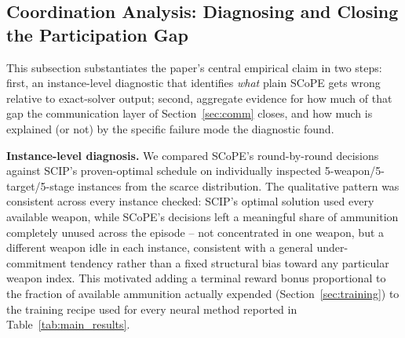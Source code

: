 
\subsection{Coordination Analysis: Diagnosing and Closing the Participation Gap}
\label{sec:coordination}

This subsection substantiates the paper's central empirical claim in two steps: first, an instance-level diagnostic that identifies \emph{what} plain SCoPE gets wrong relative to exact-solver output; second, aggregate evidence for how much of that gap the communication layer of Section~\ref{sec:comm} closes, and how much is explained (or not) by the specific failure mode the diagnostic found.

\textbf{Instance-level diagnosis.} We compared SCoPE's round-by-round decisions against SCIP's proven-optimal schedule on individually inspected 5-weapon/5-target/5-stage instances from the scarce distribution. The qualitative pattern was consistent across every instance checked: SCIP's optimal solution used every available weapon, while SCoPE's decisions left a meaningful share of ammunition completely unused across the episode -- not concentrated in one weapon, but a different weapon idle in each instance, consistent with a general under-commitment tendency rather than a fixed structural bias toward any particular weapon index. This motivated adding a terminal reward bonus proportional to the fraction of available ammunition actually expended (Section~\ref{sec:training}) to the training recipe used for every neural method reported in Table~\ref{tab:main_results}.

